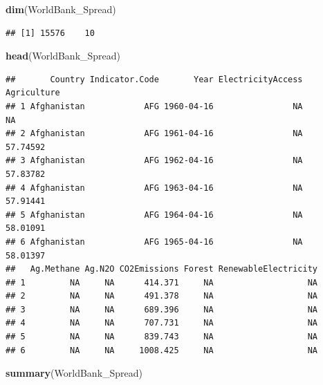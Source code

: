 \documentclass[12pt,]{article}
\newenvironment{Shaded}{\begin{snugshade}}{\end{snugshade}}
\newcommand{\KeywordTok}[1]{\textcolor[rgb]{0.13,0.29,0.53}{\textbf{#1}}}
\newcommand{\NormalTok}[1]{#1}
\begin{document}
\begin{Shaded}
\begin{Highlighting}[]
\KeywordTok{dim}\NormalTok{(WorldBank_Spread)}
\end{Highlighting}
\end{Shaded}

\begin{verbatim}
## [1] 15576    10
\end{verbatim}

\begin{Shaded}
\begin{Highlighting}[]
\KeywordTok{head}\NormalTok{(WorldBank_Spread)}
\end{Highlighting}
\end{Shaded}

\begin{verbatim}
##       Country Indicator.Code       Year ElectricityAccess Agriculture
## 1 Afghanistan            AFG 1960-04-16                NA          NA
## 2 Afghanistan            AFG 1961-04-16                NA    57.74592
## 3 Afghanistan            AFG 1962-04-16                NA    57.83782
## 4 Afghanistan            AFG 1963-04-16                NA    57.91441
## 5 Afghanistan            AFG 1964-04-16                NA    58.01091
## 6 Afghanistan            AFG 1965-04-16                NA    58.01397
##   Ag.Methane Ag.N2O CO2Emissions Forest RenewableElectricity
## 1         NA     NA      414.371     NA                   NA
## 2         NA     NA      491.378     NA                   NA
## 3         NA     NA      689.396     NA                   NA
## 4         NA     NA      707.731     NA                   NA
## 5         NA     NA      839.743     NA                   NA
## 6         NA     NA     1008.425     NA                   NA
\end{verbatim}

\begin{Shaded}
\begin{Highlighting}[]
\KeywordTok{summary}\NormalTok{(WorldBank_Spread)}
\end{Highlighting}
\end{Shaded}
\end{document}

